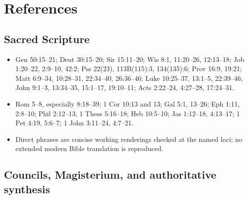\section{References}

\begingroup
\setlength{\parskip}{0pt}
\titlespacing*{\subsection}{0pt}{1.0ex}{0.3ex}

\subsection*{Sacred Scripture}

{\fontsize{8.6}{9.6}\selectfont
\begin{itemize}[itemsep=0pt,parsep=0pt,topsep=0.05em]
\item Gen 50:15--21; Deut 30:15--20; Sir 15:11--20; Wis 8:1, 11:20--26, 12:13--18; Job 1:20--22, 2:9--10, 42:2; Pss 22(23), 113B(115):3, 134(135):6; Prov 16:9, 19:21; Matt 6:9--34, 10:28--31, 22:34--40, 26:36--46; Luke 10:25--37, 13:1--5, 22:39--46; John 9:1--3, 13:34--35, 15:1--17, 19:10--11; Acts 2:22--24, 4:27--28, 17:24--31.
\item Rom 5--8, especially 8:18--39; 1 Cor 10:13 and 13; Gal 5:1, 13--26; Eph 1:11, 2:8--10; Phil 2:12--13; 1 Thess 5:16--18; Heb 10:5--10; Jas 1:12--18, 4:13--17; 1 Pet 4:19, 5:6--7; 1 John 3:11--24, 4:7--21.
\item Direct phrases are concise working renderings checked at the named loci; no extended modern Bible translation is reproduced.
\end{itemize}}

\subsection*{Councils, Magisterium, and authoritative synthesis}

